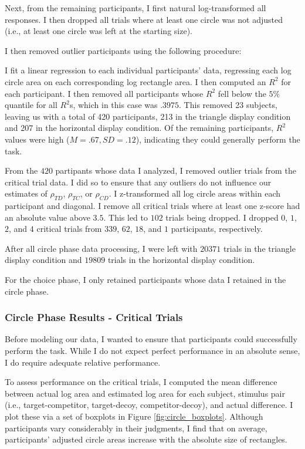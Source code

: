 Next, from the remaining participants, I first natural log-transformed all responses. I then dropped all trials where at least one circle was not adjusted (i.e., at least one circle was left at the starting size).

I then removed outlier participants using the following procedure:

I fit a linear regression to each individual participants' data, regressing each log circle area on each corresponding log rectangle area. I then computed an $R^2$ for each participant. I then removed all participants whose $R^2$ fell below the $5\%$ quantile for all $R^2$s, which in this case was $.3975$. This removed 23 subjects, leaving us with a total of 420 participants, 213 in the triangle display condition and 207 in the horizontal display condition. Of the remaining participants, $R^2$ values were high ($M=.67,SD=.12$), indicating they could generally perform the task.

From the $420$ partipants whose data I analyzed, I removed outlier trials from the critical trial data. I did so to ensure that any outliers do not influence our estimates of $\rho_{TD}$, $\rho_{TC}$, or $\rho_{CD}$. I z-transformed all log circle areas within each participant and diagonal. I remove all critical trials where at least one z-score had an absolute value above $3.5$. This led to $102$ trials being dropped. I dropped $0$, $1$, $2$, and $4$ critical trials from $339$, $62$, $18$, and $1$ participants, respectively. 

After all circle phase data processing, I were left with $20371$ trials in the triangle display condition and $19809$ trials in the horizontal display condition. 

For the choice phase, I only retained participants whose data I retained in the circle phase.

\subsubsection{Circle Phase Results - Critical Trials}
Before modeling our data, I wanted to ensure that participants could successfully perform the task. While I do not expect perfect performance in an absolute sense, I do require adequate relative performance. 

To assess performance on the critical trials, I computed the mean difference between actual log area and estimated log area for each subject, stimulus pair (i.e., target-competitor, target-decoy, competitor-decoy), and actual difference. I plot these via a set of boxplots in Figure \ref{fig:circle_boxplots}. Although participants vary considerably in their judgments, I find that on average, participants' adjusted circle areas increase with the absolute size of rectangles. 


